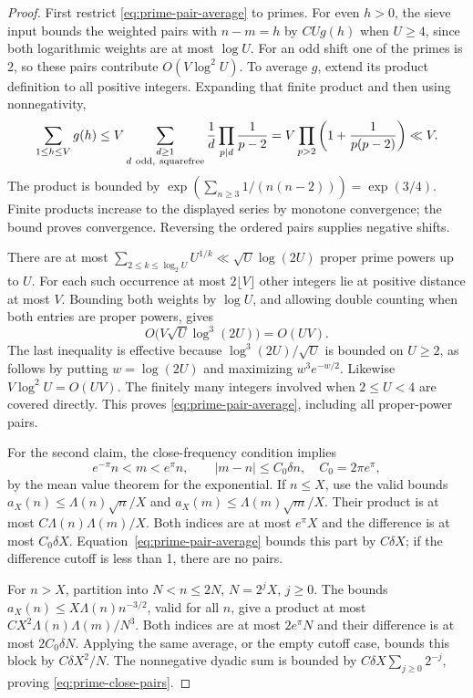 \documentclass[11pt]{article}
\begin{document}
\begin{proof}
First restrict \eqref{eq:prime-pair-average} to primes. For even
\(h>0\), the sieve input bounds the weighted pairs with \(n-m=h\)
by \(CUg(h)\) when \(U\geq4\), since both logarithmic weights are
at most \(\log U\). For an odd shift one of the primes is 2, so
these pairs contribute \(O(V\log^2U)\).
To average \(g\), extend its product definition to all positive
integers. Expanding that finite product and then using nonnegativity,
\[
 \sum_{1\leq h\leq V}g(h)
 \leq V\sum_{\substack{d\geq1\\d\ {\rm odd,\ squarefree}}}
       \frac1d\prod_{p\mid d}\frac1{p-2}
 =V\prod_{p>2}\left(1+\frac1{p(p-2)}\right)\ll V.
\]
The product is bounded by
\(\exp(\sum_{n\geq3}1/(n(n-2)))=\exp(3/4)\).
Finite products increase to the displayed series by monotone
convergence; the bound proves convergence. Reversing the ordered
pairs supplies negative shifts.

There are at most
\(\sum_{2\leq k\leq\log_2U}U^{1/k}\ll\sqrt U\log(2U)\)
proper prime powers up to \(U\). For each such occurrence at most
\(2\lfloor V\rfloor\) other integers lie at positive distance at
most \(V\). Bounding both weights by \(\log U\), and allowing
double counting when both entries are proper powers, gives
\[
 O\bigl(V\sqrt U\log^3(2U)\bigr)=O(UV).
\]
The last inequality is effective because
\(\log^3(2U)/\sqrt U\) is bounded on \(U\geq2\), as follows by
putting \(w=\log(2U)\) and maximizing \(w^3e^{-w/2}\).
Likewise \(V\log^2U=O(UV)\). The finitely many integers involved
when \(2\leq U<4\) are covered directly. This proves
\eqref{eq:prime-pair-average}, including all proper-power pairs.

For the second claim, the close-frequency condition implies
\[
 e^{-\pi}n<m<e^\pi n,\qquad
 |m-n|\leq C_0\delta n,\quad C_0=2\pi e^\pi,
\]
by the mean value theorem for the exponential. If \(n\leq X\),
use the valid bounds
\(a_X(n)\leq\Lambda(n)\sqrt n/X\) and
\(a_X(m)\leq\Lambda(m)\sqrt m/X\).
Their product is at most \(C\Lambda(n)\Lambda(m)/X\).
Both indices are at most \(e^\pi X\) and the difference is at most
\(C_0\delta X\). Equation~\eqref{eq:prime-pair-average} bounds
this part by \(C\delta X\); if the difference cutoff is less than 1,
there are no pairs.

For \(n>X\), partition into \(N<n\leq2N\), \(N=2^jX\), \(j\geq0\).
The bounds \(a_X(n)\leq X\Lambda(n)n^{-3/2}\), valid for all \(n\),
give a product at most \(CX^2\Lambda(n)\Lambda(m)/N^3\).
Both indices are at most \(2e^\pi N\) and their difference is at
most \(2C_0\delta N\). Applying the same average, or the empty
cutoff case, bounds this block by \(C\delta X^2/N\).
The nonnegative dyadic sum is bounded by
\(C\delta X\sum_{j\geq0}2^{-j}\), proving \eqref{eq:prime-close-pairs}.
\end{proof}
\end{document}

